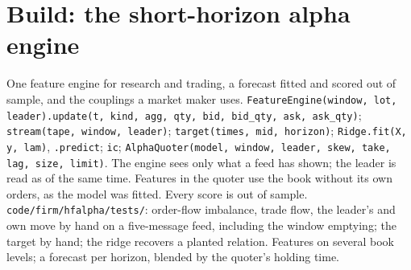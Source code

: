 \begin{omfigure}

\label{fig:hf:short-horizon-alpha:calib}
\end{omfigure}

\section{Build: the short-horizon alpha engine}\label{bld:hf:short-horizon-alpha:hfalpha}

\begin{build}
 One feature engine for research and trading, a forecast fitted and scored out of sample, and the couplings a market maker uses.
 \texttt{FeatureEngine(window, lot, leader).update(t, kind, agg, qty, bid, bid\_qty, ask, ask\_qty)}; \texttt{stream(tape, window,
leader)}; \texttt{target(times, mid, horizon)}; \texttt{Ridge.fit(X, y, lam)}, \texttt{.predict}; \texttt{ic}; \texttt{AlphaQuoter(model, window,
leader, skew, take, lag, size, limit)}.
 The engine sees only what a feed has shown; the leader is read as of the same time. Features in the quoter use the book without its
own orders, as the model was fitted. Every score is out of sample.
 \texttt{code/firm/hfalpha/tests/}: order-flow imbalance, trade flow, the leader's and own move by hand on a five-message
feed, including the window emptying; the target by hand; the ridge recovers a planted relation.
 Features on several book levels; a forecast per horizon, blended by the quoter's holding time.
\end{build}

